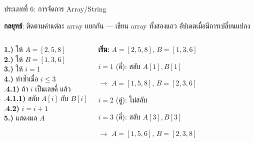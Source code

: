 \documentclass[11pt, aspectratio=169]{beamer}
\begin{document}
\begin{frame}{ประเภทที่ 6: การจัดการ Array/String}
  \begin{explanation}
    \textbf{กลยุทธ์}: ติดตามค่าแต่ละ array แยกกัน — เขียน array ทั้งสองแถว อัปเดตเมื่อมีการเปลี่ยนแปลง
  \end{explanation}

  \begin{columns}[T]
      \begin{pseudobox}
        \textbf{1.)} ให้ $A = [2, 5, 8]$ \\
        \textbf{2.)} ให้ $B = [1, 3, 6]$ \\
        \textbf{3.)} ให้ $i = 1$ \\
        \textbf{4.)} ทำซํ้าเมื่อ $i \leq 3$ \\
        .\qquad \textbf{4.1)} ถ้า $i$ เป็นเลขคี่ แล้ว \\
        .\qquad\quad \textbf{4.1.1)} สลับ $A[i]$ กับ $B[i]$ \\
        .\qquad \textbf{4.2)} $i = i + 1$ \\
        \textbf{5.)} แสดงผล $A$
      \end{pseudobox}
      \begin{solbox}[ติดตาม]
        \textbf{เริ่ม:} $A=[2,5,8]$, $B=[1,3,6]$

        $i=1$ (คี่): สลับ $A[1],B[1]$

        $\rightarrow$ $A=[1,5,8]$, $B=[2,3,6]$

        $i=2$ (คู่): ไม่สลับ

        $i=3$ (คี่): สลับ $A[3],B[3]$

        $\rightarrow$ $A=[1,5,6]$, $B=[2,3,8]$

      \end{solbox}
  \end{columns}
\end{frame}
\end{document}

